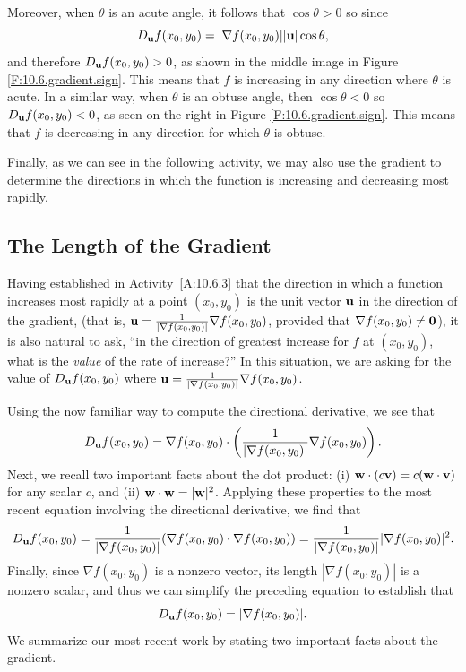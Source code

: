 Moreover, when $\theta$ is an acute angle, it follows that $\cos\theta > 0$ so since $$
D_{\mathbf{u}}f(x_0,y_0) = |\nabla f(x_0,y_0)||\mathbf{u}|
\cos\theta,
$$
and therefore $D_{\mathbf{u}}f(x_0,y_0) > 0$, as shown in the middle image in Figure
\ref{F:10.6.gradient.sign}.  This means that $f$ is increasing in any direction where
$\theta$ is acute.  In a similar way, when $\theta$ is an obtuse angle, then $\cos\theta < 0$ so $D_{\mathbf{u}}f(x_0,y_0) < 0$, as seen on the right in Figure \ref{F:10.6.gradient.sign}.  This
means that $f$ is decreasing in any direction for which $\theta$ is obtuse.

Finally, as we can see in the following activity, we may also use the gradient to determine the directions in which the function is increasing and decreasing most rapidly.



%

\subsection*{The Length of the Gradient}

Having established in Activity~\ref{A:10.6.3} that the direction in which a function increases most rapidly at a point $(x_0,y_0)$ is the unit vector $\mathbf{u}$ in the direction of the gradient, (that is, $\mathbf{u} = \frac{1}{|\nabla f(x_0,y_0)|} \nabla f(x_0,y_0)$, provided that $\nabla f(x_0,y_0) \ne \mathbf{0}$), it is also natural to ask, ``in the direction of greatest increase for $f$ at $(x_0,y_0)$, what is the \emph{value} of the rate of increase?''  In this situation, we are asking for the value of $D_{\mathbf{u}} f(x_0,y_0)$ where $\mathbf{u} = \frac{1}{|\nabla f(x_0,y_0)|} \nabla f(x_0,y_0)$.

Using the now familiar way to compute the directional derivative, we see that
$$D_{\mathbf{u}} f(x_0,y_0) = \nabla f(x_0,y_0) \cdot \left(\frac{1}{|\nabla f(x_0,y_0)|} \nabla f(x_0,y_0) \right).$$
Next, we recall two important facts about the dot product:  (i) $\mathbf{w}\cdot (c \mathbf{v}) = c (\mathbf{w} \cdot \mathbf{v})$ for any scalar $c$, and (ii) $\mathbf{w} \cdot \mathbf{w} = |\mathbf{w}|^2$.  Applying these properties to the most recent equation involving the directional derivative, we find that 
$$D_{\mathbf{u}} f(x_0,y_0) = \frac{1}{|\nabla f(x_0,y_0)|}  (\nabla f(x_0,y_0) \cdot \nabla f(x_0,y_0)) = \frac{1}{|\nabla f(x_0,y_0)|} |\nabla f(x_0,y_0)|^2. $$
Finally, since $\nabla f(x_0,y_0)$ is a nonzero vector, its length $|\nabla f(x_0,y_0)|$ is a nonzero scalar, and thus we can simplify the preceding equation to establish that
$$D_{\mathbf{u}} f(x_0,y_0) = |\nabla f(x_0,y_0)|.$$
We summarize our most recent work by stating two important facts about the gradient.

